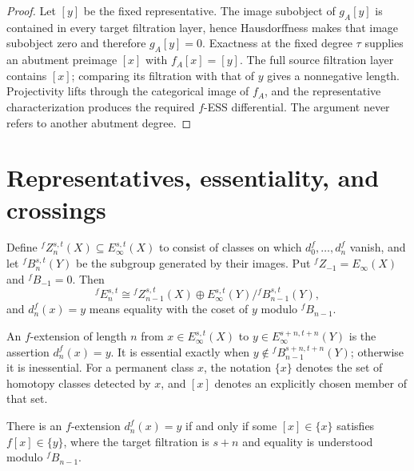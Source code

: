 \begin{proof}
  Let $[y]$ be the fixed representative.  The image subobject of $g_A[y]$ is
  contained in every target filtration layer, hence Hausdorffness makes that
  image subobject zero and therefore $g_A[y]=0$.  Exactness at the fixed degree
  $\tau$ supplies an abutment preimage $[x]$ with $f_A[x]=[y]$.  The full
  source filtration layer contains $[x]$; comparing its filtration with that
  of $y$ gives a nonnegative length.  Projectivity lifts through the
  categorical image of $f_A$, and the representative characterization
  produces the required $f$-ESS differential.  The argument never refers to
  another abutment degree.
\end{proof}

\section{Representatives, essentiality, and crossings}

\begin{definition}
  \label{def:fess-cycles-boundaries}
  \notready
  Define ${}^fZ_n^{s,t}(X)\subseteq E_\infty^{s,t}(X)$ to consist of classes
  on which $d_0^f,\ldots,d_n^f$ vanish, and let
  ${}^fB_n^{s,t}(Y)$ be the subgroup generated by their images.  Put
  ${}^fZ_{-1}=E_\infty(X)$ and ${}^fB_{-1}=0$.  Then
  \[
    {}^fE_n^{s,t}\cong{}^fZ_{n-1}^{s,t}(X)\oplus
      E_\infty^{s,t}(Y)/{}^fB_{n-1}^{s,t}(Y),
  \]
  and $d_n^f(x)=y$ means equality with the coset of $y$ modulo
  ${}^fB_{n-1}$.
\end{definition}

\begin{definition}
  \label{def:f-extension-essential}
  \notready
  An $f$-extension of length $n$ from
  $x\in E_\infty^{s,t}(X)$ to
  $y\in E_\infty^{s+n,t+n}(Y)$ is the assertion $d_n^f(x)=y$.
  It is essential exactly when
  $y\notin{}^fB_{n-1}^{s+n,t+n}(Y)$; otherwise it is inessential.  For a
  permanent class $x$, the notation $\{x\}$ denotes the set of homotopy
  classes detected by $x$, and $[x]$ denotes an explicitly chosen member of
  that set.
\end{definition}

\begin{proposition}
  \label{prop:fextension-iff-detected}
  \notready
  There is an $f$-extension $d_n^f(x)=y$ if and only if some
  $[x]\in\{x\}$ satisfies $f[x]\in\{y\}$, where the target filtration is
  $s+n$ and equality is understood modulo ${}^fB_{n-1}$.
\end{proposition}

